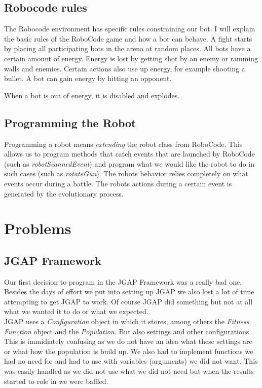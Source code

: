\documentclass[a4paper,10pt]{article}
\begin{document}
\subsection{Robocode rules}
The Robocode environment has specific rules constraining our bot. I will explain the basic rules of the RoboCode game and how a bot can behave.
A fight starts by placing all participating bots in the arena at random places. All bots have a certain amount of energy. Energy is lost by getting shot by an enemy or ramming walls and enemies. Certain actions also use up energy, for example shooting a bullet.
A bot can gain energy by hitting an opponent.

When a bot is out of energy, it is disabled and explodes.

\subsection{Programming the Robot}
Programming a robot means \textit{extending} the robot class from RoboCode. This allows us to program methods that catch events that are launched by RoboCode (such as \textit{robotScannedEvent}) and program what we would like the robot to do in such cases (such as \textit{rotateGun}). The robots behavior relies completely on what events occur during a battle. The robots actions during a certain event is generated by the evolutionary process. 



\section{Problems}
\subsection{JGAP Framework}
Our first decision to program in the JGAP Framework was a really bad one. Besides the days of effort we put into setting up JGAP we also lost a lot of time
attempting to get JGAP to work. Of course JGAP did something but not at all what we wanted it to do or what we expected. \\

JGAP uses a \textit{Configuration} object in which it stores, among others the \textit{Fitness Function} object and the \textit{Population}. But also settings 
and other configurations.. This is immidiately confusing as we do not have an idea what these settings are or what how the population is build up. We also had to 
implement functions we had no need for and had to use with variables (arguments) we did not want. This was easily handled as we did not use what we did not need but when 
the results started to role in we were baffled. \\
\end{document}
